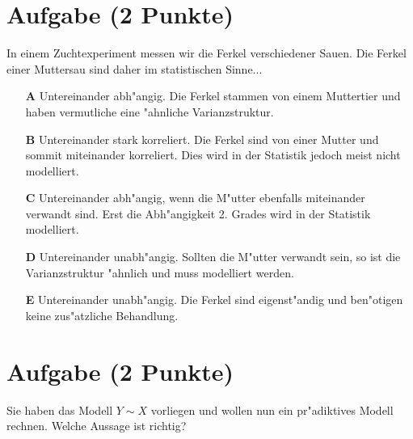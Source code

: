 \documentclass[a4paper, 10pt]{scrartcl}\usepackage[]{graphicx}\usepackage[]{xcolor}
\begin{document}
\section{Aufgabe \hfill (2 Punkte)}

In einem Zuchtexperiment messen wir die Ferkel verschiedener Sauen. Die
Ferkel einer Muttersau sind daher im statistischen Sinne... 



\begin{enumerate}
\item [\textbf{A} \msquare] Untereinander abh{"a}ngig. Die Ferkel stammen von einem Muttertier und haben vermutliche eine {"a}hnliche Varianzstruktur.
\item [\textbf{B} \msquare] Untereinander stark korreliert. Die Ferkel sind von einer Mutter und sommit miteinander korreliert. Dies wird in der Statistik jedoch meist nicht modelliert.
\item [\textbf{C} \msquare] Untereinander abh{"a}ngig, wenn die M{"u}tter ebenfalls miteinander verwandt sind. Erst die Abh{"a}ngigkeit 2. Grades wird in der Statistik modelliert.
\item [\textbf{D} \msquare] Untereinander unabh{"a}ngig. Sollten die M{"u}tter verwandt sein, so ist die Varianzstruktur {"a}hnlich und muss modelliert werden.
\item [\textbf{E} \msquare] Untereinander unabh{"a}ngig. Die Ferkel sind eigenst{"a}ndig und ben{"o}tigen keine zus{"a}tzliche Behandlung.
\end{enumerate}

\section{Aufgabe \hfill (2 Punkte)}




Sie haben das Modell $Y \sim X$ vorliegen und wollen nun ein
pr{"a}diktives Modell rechnen. Welche Aussage ist richtig?
\end{document}

